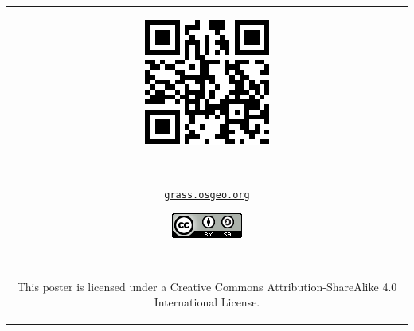 \documentclass[25pt, margin=0mm, innermargin=15mm, blockverticalspace=15mm, colspace=15mm, subcolspace=8mm]{tikzposter}
\begin{document}
\begin{columns}
{\begin{center}
\begin{tabular}{c}
\begin{minipage}{\qrcodesize}
\includegraphics[width=\textwidth]{./images/qr_grass.pdf}
\end{minipage}
~
\begin{minipage}{0.15\linewidth}
\small {\href{http://grass.osgeo.org}{\nolinkurl{grass.osgeo.org}}}
\end{minipage}

\begin{minipage}{0.1\linewidth}
\href{http://creativecommons.org/licenses/by-sa/4.0/}{\includegraphics[width=\textwidth]{ccbysa}}
\end{minipage}
~
\begin{minipage}{0.35\linewidth}
\small This poster is licensed under a Creative Commons Attribution-ShareAlike 4.0 International License.
\end{minipage}


\end{tabular}
\end{center}}
\end{columns}
\end{document}
